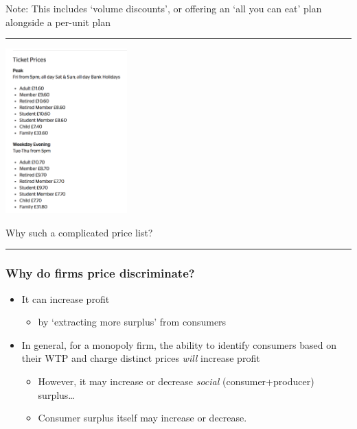 \documentclass[]{article}
\providecommand{\tightlist}{%
  \setlength{\itemsep}{0pt}\setlength{\parskip}{0pt}}
\begin{document}
Note: This includes `volume discounts', or offering an `all you can eat' plan alongside a per-unit plan

\begin{center}\rule{0.5\linewidth}{\linethickness}\end{center}

\includegraphics[height=2.5in]{picsfigs/exeter_picturehouse.png}

Why such a complicated price list?

\begin{center}\rule{0.5\linewidth}{\linethickness}\end{center}

\hypertarget{why-do-firms-price-discriminate}{%
\subsubsection{Why do firms price discriminate?}\label{why-do-firms-price-discriminate}}

\begin{itemize}
\item
  It can increase profit

  \begin{itemize}
  \tightlist
  \item
    by `extracting more surplus' from consumers
  \end{itemize}
\item
  In general, for a monopoly firm, the ability to identify consumers based on their WTP and charge distinct prices \emph{will} increase profit

  \begin{itemize}
  \tightlist
  \item
    However, it may increase or decrease \emph{social} (consumer+producer) surplus\ldots{}
  \item
    Consumer surplus itself may increase or decrease.
  \end{itemize}
\end{itemize}
\end{document}
